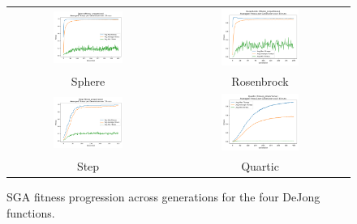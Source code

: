 \documentclass[11pt]{article}
\begin{document}
\begin{figure}[H]
    \centering
    \begin{tabular}{cc}
        \includegraphics[width=0.45\textwidth]{plots/sphere_fitness_proportional_fitness.png} &
        \includegraphics[width=0.45\textwidth]{plots/rosenbrock_fitness_proportional_fitness.png} \\
        Sphere & Rosenbrock \\
        \includegraphics[width=0.45\textwidth]{plots/step_fitness_proportional_fitness.png} &
        \includegraphics[width=0.45\textwidth]{plots/quartic_fitness_proportional_fitness.png} \\
        Step & Quartic \\
    \end{tabular}
    \caption{SGA fitness progression across generations for the four DeJong functions.}
    \label{fig:fitness-plots}
\end{figure}
\clearpage
\end{document}

